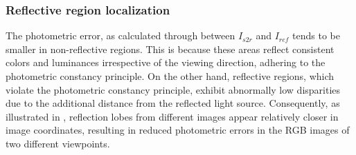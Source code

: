 \subsubsection{Reflective region localization}
\label{sec:reflective_region_localization}
The photometric error, as calculated through  between $I_{s2r}$ and $I_{ref}$ tends to be smaller in non-reflective regions. This is because these areas reflect consistent colors and luminances irrespective of the viewing direction, adhering to the photometric constancy principle.
On the other hand, reflective regions, which violate the photometric constancy principle, exhibit abnormally low disparities due to the additional distance from the reflected light source.
Consequently, as illustrated in , reflection lobes from different images appear relatively closer in image coordinates, resulting in reduced photometric errors in the RGB images of two different viewpoints.

